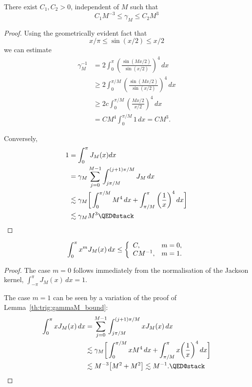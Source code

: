\begin{lemma} \label{th:trig:gammaM_bound}
  There exist $C_1, C_2 > 0$, independent of $M$ such that
  \[
    C_1 M^{-3} \leq  \gamma_M \leq C_2 M^3
  \]
\end{lemma}
\begin{proof}
  Using the geometrically evident fact that
  \[
    x/\pi \leq \sin(x/2) \leq x/2
  \]
  we can estimate
  \begin{align*}
    \gamma_M^{-1}
    &= 2 \int_0^\pi  \left( \frac{\sin( Mx/2)}{\sin(x/2)} \right)^4 \, dx  \\
    &\geq 2 \int_0^{\pi/M} \left( \frac{\sin( Mx/2)}{\sin(x/2)} \right)^4 \, dx \\
    &\geq 2c \int_0^{\pi/M} \left( \frac{Mx/2}{x/2} \right)^4 \, dx \\
    &= C M^4 \int_0^{\pi/M} 1 \,dx = C M^3.
  \end{align*}

  Conversely,
  \begin{align*}
    1 &= \int_0^\pi J_M(x) dx \\
    &= \gamma_M \sum_{j = 0}^{M-1} \int_{j\pi/M}^{(j+1)\pi/M} J_M \, dx \\
    &\lesssim
        \gamma_M \bg[ \int_0^{\pi/M} M^4 \, dx
        + \int_{\pi/M}^{\pi}
             \bg( \frac{1}{x} \bg)^4 \, dx \bg] \\
    &\lesssim \gamma_M M^3  \qedhere
  \end{align*}
\end{proof}

\begin{lemma} \label{th:trig:jackson_moments}
  \[
    \int_0^\pi x^m J_M(x) \,dx \leq
      \left\{ \begin{array}{ll} C, & m = 0, \\
            C M^{-1}, & m = 1.
           \end{array} \right.
  \]
\end{lemma}
\begin{proof}
  The case $m = 0$ follows immediately  from the normalisation of the
  Jackson kernel, $\int_{-\pi}^\pi J_M(x)\,dx = 1$.

  The case $m = 1$ can be seen by a variation of the proof of
  Lemma~\ref{th:trig:gammaM_bound}:
  \begin{align*}
    \int_0^\pi x J_M(x) \, dx
    &= \sum_{j = 0}^{M-1} \int_{j\pi/M}^{(j+1)\pi/M} x J_M(x) \, dx \\
    &\lesssim
        \gamma_M \bg[ \int_0^{\pi/M} x M^4 \, dx
        + \int_{\pi/M}^{\pi}
             x \bg( \frac{1}{x} \bg)^4 \, dx \bg] \\
    &\lesssim
      M^{-3} \b[ M^{2} + M^{2} \b]
      \lesssim M^{-1}.
      \qedhere
  \end{align*}
\end{proof}


